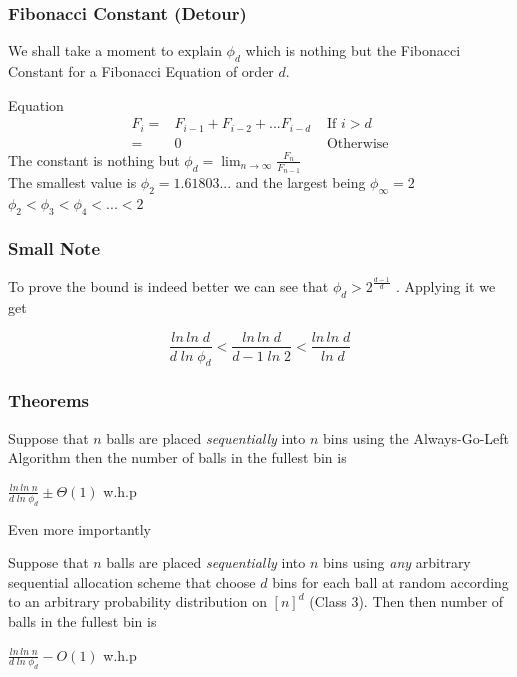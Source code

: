 \documentclass{beamer}
\begin{document}
\begin{frame}
\frametitle{Fibonacci Constant (Detour)}
We shall take a moment to explain $\phi_d$ which is nothing but the Fibonacci Constant for a Fibonacci Equation of order $d$. 
\begin{block}
{Equation}
\begin{eqnarray}
 F_i  = &  F_{i-1} + F_{i-2} + ... F_{i-d} & \text{ If $i > d$} \nonumber \\
  = &  0 & \text{ Otherwise} \nonumber 
\end{eqnarray}
The constant is nothing but $\phi_d=\lim_{n \to \infty} \frac{F_n}{F_{n-1}}$ \\
The smallest value is $\phi_2 = 1.61803...$ and the largest being $\phi_\infty=2$ \\
$\phi_2 < \phi_3 < \phi_4 < ... < 2$
\end{block}



\end{frame}






%
\begin{frame}
\frametitle{Small Note}
To prove the bound is indeed better we can see that $\phi_d > 2^{\frac{d-1}{d}}$ . Applying it we get
\begin{center}
 \begin{equation}
  \frac{ln \, ln\;d}{d\;ln \; \phi_d} <   \frac{ln \, ln\;d}{d-1\;ln \; 2} <   \frac{ln \, ln\;d}{\;ln \; d} \nonumber
 \end{equation}
\end{center}
\end{frame}
%

\begin{frame}
\frametitle{Theorems}
\begin{theorem}
Suppose that $n$ balls are placed \textit{sequentially} into $n$ bins using the Always-Go-Left Algorithm then the number of balls in the fullest bin is \\
\begin{center}
$\frac{ln \, ln \; n}{d \; ln \; {\phi_d} }  \pm \Theta (1)$ w.h.p
\end{center}
\end{theorem}
Even more importantly
\begin{theorem}
Suppose that $n$ balls are placed \textit{sequentially} into $n$ bins using \textit{any} arbitrary sequential allocation scheme that choose $d$ bins for each ball at random according to an arbitrary probability distribution on $[n]^d$ (Class 3). Then then number of balls in the fullest bin is   \\
\begin{center}
$\frac{ln \, ln \; n}{d \; ln \; {\phi_d} }  - O(1)$ w.h.p
\end{center}
\end{theorem}


\end{frame}
\end{document}
